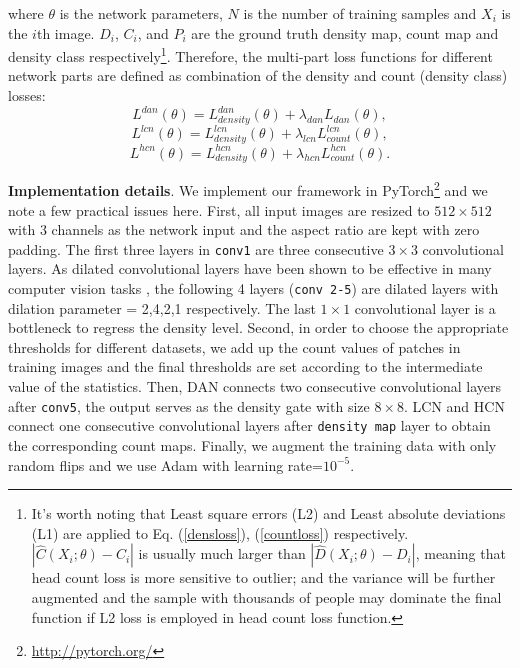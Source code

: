 \documentclass[journal]{IEEEtran}
\begin{document}
\noindent where $\theta$ is the network parameters, $N$ is the number of training samples and $X_i$ is the $i$th image. $D_i$, $C_i$, and $P_i$ are the ground truth density map, count map and density class respectively\footnote{It's worth noting that Least square errors (L2) and Least absolute deviations (L1) are applied to Eq. (\ref{densloss}), (\ref{countloss}) respectively. $|\hat C(X_i;\theta) - C_i |$ is usually much larger than $| \hat D(X_i;\theta) - D_i |$, meaning that head count loss is more sensitive to outlier; and the variance will be further augmented and the sample with thousands of people may dominate the final function if L2 loss is employed in head count loss function.}. Therefore, the multi-part loss functions for different network parts are defined as combination of the density and count (density class) losses:
\begin{equation}
  L^{dan}(\theta) = L_{density}^{dan}(\theta) + \lambda_{dan}L_{dan}(\theta), \label{cnetloss}
\end{equation}
\begin{equation}
  L^{lcn}(\theta) = L_{density}^{lcn}(\theta) + \lambda_{lcn}L_{count}^{lcn}(\theta), \label{snetloss}
\end{equation}
\begin{equation}
  L^{hcn}(\theta) = L_{density}^{hcn}(\theta) + \lambda_{hcn}L_{count}^{hcn}(\theta).  \label{dnetloss}
\end{equation}

\vspace{0.05in}\noindent \textbf{Implementation details}. We implement our framework in PyTorch\footnote{\url{http://pytorch.org/}} and we note a few practical issues here. First, all input images are resized to $512\times512$ with 3 channels as the network input and the aspect ratio are kept with zero padding. The first three layers in {\tt conv1} are three consecutive $3\times3$ convolutional layers. As dilated convolutional layers have been shown to be effective in many computer vision tasks \cite{yu2017dilated,zheng2018learning,rene2017temporal,xu2018dense}, the following 4 layers ({\tt conv 2-5}) are dilated layers with dilation parameter = 2,4,2,1 respectively. The last $1\times 1$ convolutional layer is a bottleneck to regress the density level. Second, in order to choose the appropriate thresholds for different datasets, we add up the count values of patches in training images and the final thresholds are set according to the intermediate value of the statistics. Then, DAN connects two consecutive convolutional layers after {\tt conv5}, the output serves as the density gate with size $8 \times 8$. LCN and HCN connect one consecutive convolutional layers after {\tt density map} layer to obtain the corresponding count maps. Finally, we augment the training data with only random flips and we use Adam with learning rate=$10^{-5}$.
\end{document}
